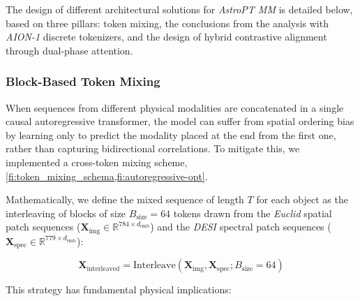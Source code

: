 The design of different architectural solutions for \textit{AstroPT MM} is detailed below, based on three pillars: token mixing, the conclusions from the analysis with \textit{AION-1} discrete tokenizers, and the design of hybrid contrastive alignment through dual-phase attention.

\subsubsection{Block-Based Token Mixing} \label{sec:dev:tokmix}

When sequences from different physical modalities are concatenated in a single causal autoregressive transformer, the model can suffer from spatial ordering bias by learning only to predict the modality placed at the end from the first one, rather than capturing bidirectional correlations. To mitigate this, we implemented a cross-token mixing scheme, \cref{fi:token_mixing_schema,fi:autoregressive-opt}.

Mathematically, we define the mixed sequence of length $T$ for each object as the interleaving of blocks of size $B_{\text{size}} = 64$ tokens drawn from the \textit{Euclid} spatial patch sequences ($\mathbf{X}_{\text{img}} \in \mathbb{R}^{784 \times d_{\text{emb}}}$) and the \textit{\gls{DESI}} spectral patch sequences ($\mathbf{X}_{\text{spec}} \in \mathbb{R}^{779 \times d_{\text{emb}}}$):

\begin{equation}
\mathbf{X}_{\text{interleaved}} = \text{Interleave}\left(\mathbf{X}_{\text{img}}, \mathbf{X}_{\text{spec}}; B_{\text{size}} = 64\right)
\label{eq:token_mixing}
\end{equation}

This strategy has fundamental physical implications:

